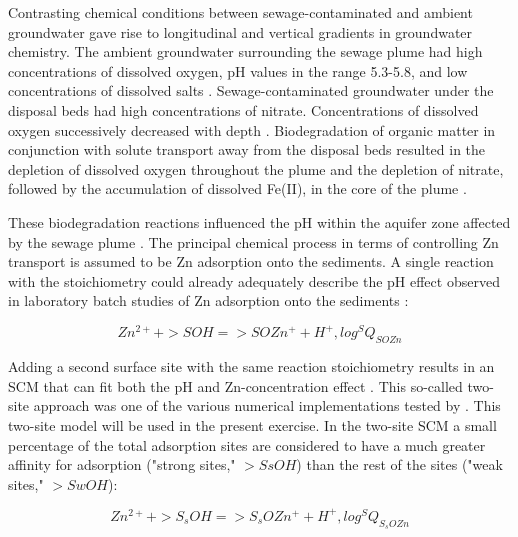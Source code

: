 Contrasting chemical conditions between sewage-contaminated
and ambient groundwater gave rise to longitudinal and 
vertical gradients in groundwater chemistry. 
The ambient groundwater surrounding the sewage plume had 
high concentrations of dissolved oxygen, pH values 
in the range 5.3-5.8, and low concentrations of dissolved salts 
\citep[]{Leblanc1991895,Hess1996,Kent1999293}.
Sewage-contaminated groundwater under the disposal beds had high 
concentrations of nitrate.
Concentrations of dissolved oxygen successively decreased with depth 
\citep[]{Smith1991285,Smith19911815}.
Biodegradation of organic matter in conjunction with solute transport 
away from the disposal beds resulted in the depletion of dissolved oxygen 
throughout the plume and the depletion of nitrate, followed by 
the accumulation of dissolved Fe(II), in the core of the plume 
\citep[]{Smith1991285,Kent19941099}. 
 
These biodegradation reactions influenced the pH  
within the aquifer zone affected by the sewage plume 
\citep[]{Abrams19981531,Abrams20002015}.
The principal chemical process in terms of controlling Zn transport is 
assumed to be Zn adsorption onto the sediments.
A single reaction with the stoichiometry could already adequately 
describe the pH effect observed in laboratory batch studies of
Zn adsorption onto the sediments \citep[]{Davis19982820}:

\begin{equation}
Zn^{2+}  +  >SOH    =  >SOZn^+  + H^+,  log  ^SQ_{SOZn}  
\label{eq:zn_single_site}
\end{equation} 

Adding a second surface site with the same reaction stoichiometry results in an  
SCM that can fit both the pH and Zn-concentration 
effect \citep[]{Davis19982820}.
This so-called two-site approach was one of the various
numerical implementations tested by \cite{Kent20003411}.
This two-site model will be used in the present exercise.
In the two-site SCM a small percentage of the total 
adsorption sites are considered to have a much greater affinity 
for adsorption ("strong sites," $>SsOH$) than the rest of the 
sites ("weak  sites," $>SwOH$): 

\begin{equation}
Zn^{2+}  +  >S_sOH    =  >S_sOZn^+  + H^+,  log  ^SQ_{S_sOZn}  
\label{eq:zn_strong_sites}
\end{equation} 

